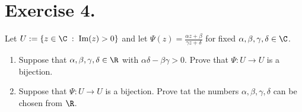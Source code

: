 \section*{Exercise 4.}
Let $U := \{ z \in\C \;:\; \mbox{Im}(z) > 0\}$ and let $\Psi(z) = \frac{\alpha z + \beta}{\gamma z + \delta}$ for fixed $\alpha,\beta,\gamma,\delta \in \C$.

\begin{enumerate}[label=(\alph*)]
    \item Suppose that $\alpha,\beta,\gamma,\delta \in \R$ with $\alpha\delta - \beta\gamma > 0$. Prove that $\Psi : U\to U$ is a bijection.
    \item Suppose that $\Psi: U \to U$ is a bijection. Prove tat the numbers $\alpha, \beta, \gamma,\delta$ can be chosen from $\R$.
\end{enumerate}
